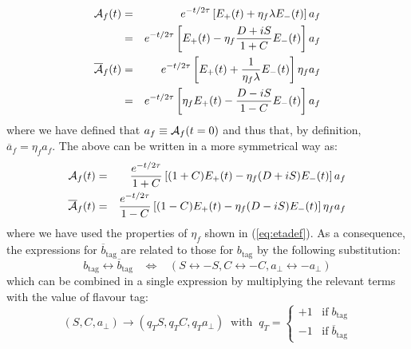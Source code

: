 \documentclass[a4paper,10pt,twosided]{article}
\begin{document}
\begin{eqnarray}
   {\cal A}_f(t)            &=& e^{-t/2\tau} \left[ E_+(t) + \eta_f \lambda E_-(t)  \right] a_f  \\
                            &=&     e^{-t/2\tau} \left[ E_+(t) -\eta_f \frac{D+iS}{1+C} E_-(t)  \right] a_f  \\
   {\overline{\cal A}}_f(t) &=& e^{-t/2\tau} \left[  E_+(t) + \frac{1}{\eta_f\lambda} E_-(t)  \right] \eta_f a_f    \\
                            &=&     e^{-t/2\tau} \left[\eta_f E_+(t) - \frac{D-iS}{1-C} E_-(t)  \right] a_f   
\end{eqnarray}
where we have defined that $a_f \equiv {\cal A}_f(t=0)$ and thus that, by definition, $\overline{a}_f = \eta_f a_f$. The above can be
written in a more symmetrical way as:
\begin{eqnarray}
   {\cal A}_f(t)           &=&     \frac{e^{-t/2\tau}}{1+C} \left[ (1+C)E_+(t) -\eta_f (D+iS) E_-(t)  \right] a_f  
\\   {\overline{\cal A}}_f(t) &=&    \frac{e^{-t/2\tau}}{1-C} \left[ (1-C)E_+(t) -\eta_f (D-iS) E_-(t)  \right] \eta_f a_f  
\end{eqnarray}
where we have used the properties of $\eta_f$ shown in (\ref{eq:etadef}).
As a consequence, the expressions for $\overline{b}_\mathrm{tag}$ are related to those for $b_\mathrm{tag}$ by the following substitution:
\begin{equation}
b_\mathrm{tag} \leftrightarrow \overline{b}_\mathrm{tag} \;\;\;\Leftrightarrow\;\;\;  ( S \leftrightarrow -S, C\leftrightarrow -C, a_\perp\leftrightarrow -a_\perp ) 
\end{equation}
which can be combined in a single expression by multiplying the relevant terms with the value of flavour tag:
\begin{equation}
(S,C,a_\perp) \rightarrow (q_T S, q_T C, q_Ta_\perp) \;\; \mathrm{with}\;\; q_T = \left\{\begin{array}{l} +1 \;\;\; \mathrm{if}\; b_\mathrm{tag} \\
                                                                                   -1 \;\;\; \mathrm{if}\; \overline{b}_\mathrm{tag}
\end{array} \right.
\end{equation}
\end{document}
